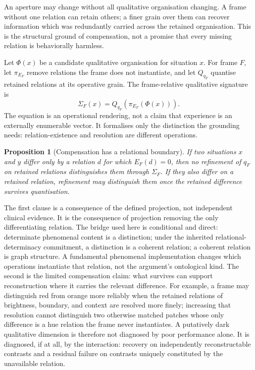\documentclass[11pt,a4paper]{article}
\newtheorem{proposition}[definition]{Proposition}
\theoremstyle{remark}\newtheorem{remark}[definition]{Remark}
\begin{document}
An aperture may change without all qualitative organisation changing. A frame
without one relation can retain others; a finer grain over them can recover
information which was redundantly carried across the retained organisation. This
is the structural ground of compensation, not a promise that every missing
relation is behaviorally harmless.

Let $\Phi(x)$ be a candidate qualitative organisation for situation $x$. For frame
$F$, let $\pi_{E_F}$ remove relations the frame does not instantiate, and let
$Q_{q_F}$ quantise retained relations at its operative grain. The frame-relative
qualitative signature is
\[
\Sigma_F(x)=Q_{q_F}\!\left(\pi_{E_F}(\Phi(x))\right).
\]
The equation is an operational rendering, not a claim that experience is an
externally enumerable vector. It formalises only the distinction the grounding
needs: relation-existence and resolution are different operations.

\begin{proposition}[Compensation has a relational boundary]\label{prop:compensation-boundary}
If two situations $x$ and $y$ differ only by a relation $d$ for which $E_F(d)=0$,
then no refinement of $q_F$ on retained relations distinguishes them through
$\Sigma_F$. If they also differ on a retained relation, refinement may distinguish
them once the retained difference survives quantisation.
\end{proposition}

The first clause is a consequence of the defined projection, not independent clinical evidence. It is the consequence of projection removing the only differentiating relation. The bridge used here is
conditional and direct: determinate phenomenal content is a distinction; under the inherited
relational-determinacy commitment, a distinction is a coherent relation; a coherent relation is graph
structure. A fundamental phenomenal implementation changes which operations instantiate that relation,
not the argument's ontological kind. The second is the limited compensation claim: what survives can
support reconstruction where it carries the relevant difference. For example, a frame may distinguish
red from orange more reliably when the retained relations of brightness, boundary, and context are
resolved more finely; increasing that resolution cannot distinguish two otherwise matched patches whose
only difference is a hue relation the frame never instantiates. A putatively dark qualitative dimension
is therefore not diagnosed by poor performance alone. It is diagnosed, if at all, by the interaction:
recovery on independently reconstructable contrasts and a residual failure on contrasts uniquely
constituted by the unavailable relation.
\end{document}
